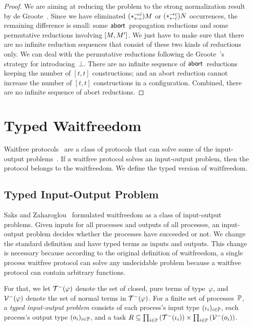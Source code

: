 \begin{proof}
We are aiming at reducing the problem to the strong normalization result
by de Groote~\cite{Philippe2002js}.
Since we have eliminated $(\ast^{\rightarrow {\bar{c}}}_{\leftarrow{c}})M$ or $(\ast^{\rightarrow {c}}_{\leftarrow{\bar{c}}})N$ occurrences,
the remaining difference is small: some $\mathsf{abort\,}$ propagation reductions
 and some permutative reductions involving $[{M,M'}]$.
We just have to make sure that there are no infinite reduction sequences
that consist of these two kinds of reductions only.
We can deal with the permutative reductions following de
 Groote~\cite{Philippe2002js}'s strategy for introducing~$\bot$.
 There are no infinite sequence of $\mathsf{abort\,}$ reductions keeping the
 number of $[t,t]$ constructions; and an abort reduction cannot increase
 the number of $[t,t]$ constructions in a configuration.  Combined,
 there are no infinite sequence of abort reductions.
\end{proof}



\section{Typed Waitfreedom}
\label{waitfreedom}

Waitfree protocols~\cite{Herlihy88,Saks:1993vq} are a class of protocols
that can solve
some of the input-output problems~\cite{Moran:1987ep,Biran:1988hh}.
If a waitfree protocol solves an input-output problem, then the protocol
belongs to the waitfreedom.
We define the typed version of waitfreedom.

\subsection{Typed Input-Output Problem}

Saks and Zaharoglou~\cite{Saks:1993vq} formulated waitfreedom as a class
of input-output
problems.
Given inputs for all processes and outputs of all
processes, an input-output problem decides whether the processes have
succeeded or not.
We change the standard definition and have typed terms as inputs and
outputs.
This change is necessary because according to the original definition of
waitfreedom,
a single process waitfree protocol can solve any undecidable problem
because a waitfree protocol can contain arbitrary functions.

For that, we let $\mathcal{T}^-(\varphi)$ denote the set of closed, pure terms of
type~$\varphi$,
and $\mathcal{V}^-(\varphi)$ denote the set of normal terms in $\mathcal{T}^-(\varphi)$.
For a finite set of processes~$\mathbb{P}$,
a \textit{typed input-output problem} consists
of each process's input type
$(\iota_i)_{i\in \mathbb{P}}$, each process's output type $(o_i)_{i\in
\mathbb{P}}$, and a
task $R\subseteq \prod_{i\in \mathbb{P}}\left(\mathcal{T}^-(\iota_i)\right)\times
 \prod_{i\in \mathbb{P}}\left(\mathcal{V}^-(o_i)\right)$.

